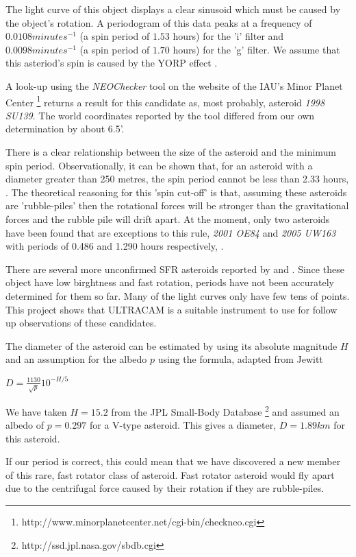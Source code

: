   The light curve of this object displays a clear sinusoid which must be caused by the object's rotation. A periodogram of this data peaks at a frequency of $0.0108 minutes^{-1}$ (a spin period of $1.53$ hours) for the 'i' filter and $0.0098 minutes^{-1}$ (a spin period of $1.70$ hours) for the 'g' filter. We assume that this asteriod's spin is caused by the YORP effect \cite{yorpeffect}. 

  A look-up using the \emph{NEOChecker} tool on the website of the IAU's Minor Planet Center \footnote{http://www.minorplanetcenter.net/cgi-bin/checkneo.cgi} returns a result for this candidate as, most probably, asteroid \emph{1998 SU139}. The world coordinates reported by the tool differed from our own determination by about 6.5'. 

  There is a clear relationship between the size of the asteroid and the minimum spin period. Observationally, it can be shown that, for an asteroid with a diameter greater than 250 metres, the spin period cannot be less than 2.33 hours, \cite{Jacobson2014}. The theoretical reasoning for this 'spin cut-off'  is that, assuming these asteroids are 'rubble-piles' then the rotational forces will be stronger than the gravitational forces and the rubble pile will drift apart. At the moment, only two asteroids have been found that are exceptions to this rule, \emph{2001 OE84} and \emph{2005 UW163} with periods of 0.486 and 1.290 hours respectively, \cite{Chang2014}. 

  There are several more unconfirmed SFR asteroids reported by \cite{Masiero2009} and \cite{Dermawan2011}. Since these object have low birghtness and fast rotation, periods have not been accurately determined for them so far. Many of the light curves only have few tens of points. This project shows that ULTRACAM is a suitable instrument to use for follow up observations of these candidates.  

  The diameter of the asteroid can be estimated by using its absolute magnitude $H$ and an assumption for the albedo $p$ using the formula, adapted from Jewitt \cite{Jewitt2013}

  $D = \frac{1130}{\sqrt{p}}10^{-H/5} $

  We have taken $H = 15.2$ from the JPL Small-Body Database \footnote{http://ssd.jpl.nasa.gov/sbdb.cgi} and assumed an albedo of $ p = 0.297$ for a V-type asteroid. This gives a diameter, $D = 1.89 km$ for this asteroid. 

  If our period is correct, this could mean that we have discovered a new member of this rare, fast rotator class of asteroid. Fast rotator asteroid would fly apart due to the centrifugal force caused by their rotation if they are rubble-piles.


